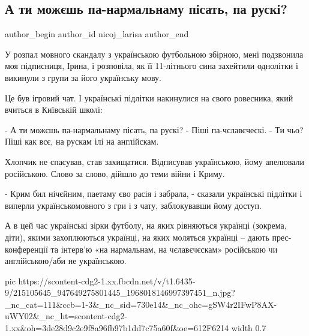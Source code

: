  
 
 
 
 
 
\subsection{А ти можєшь па-нармальнаму пісать, па рускі?}
\label{sec:08_07_2021.fb.nicoj_larisa.1.podrostki_jazyk_mova}
 
\ifcmt
 author_begin
   author_id nicoj_larisa
 author_end
\fi

У розпал мовного скандалу з українською футбольною збірною, мені подзвонила моя
підписниця, Ірина, і розповіла, як її 11-літнього сина захейтили однолітки і
викинули з групи за його українську мову. 

Це був ігровий чат. І українські підлітки накинулися на свого ровесника, який
вчиться в Київській школі:

- А ти можєшь па-нармальнаму пісать, па рускі? 
- Піші па-чєлавєческі.
- Ти чьо? Піші как всє, на рускам ілі на англійскам. 

Хлопчик не спасував, став захищатися. Відписував українською, йому апелювали
російською. Слово за слово, дійшло до теми війни і Криму.

- Крим бил нічєйним, паетаму єво расія і забрала, - сказали українські підлітки
і виперли українськомовного з гри і з чату, заблокувавши йому доступ. 

А в цей час українські зірки футболу, на яких рівняються українці (зокрема,
діти), якими захоплюються українці, на яких моляться українці – дають
прес-конференції та інтерв’ю «на нармальнам, на чєлавєчєскам» російською чи
англійською/аби не українською.

\ifcmt
  pic https://scontent-cdg2-1.xx.fbcdn.net/v/t1.6435-9/215105645_947649275801445_1968018146997397451_n.jpg?_nc_cat=111&ccb=1-3&_nc_sid=730e14&_nc_ohc=gSW4r2IFwP8AX-uWY02&_nc_ht=scontent-cdg2-1.xx&oh=3de28d9c2e9f8a96fb97b1dd7c75a60f&oe=612F6214
  width 0.7
\fi

